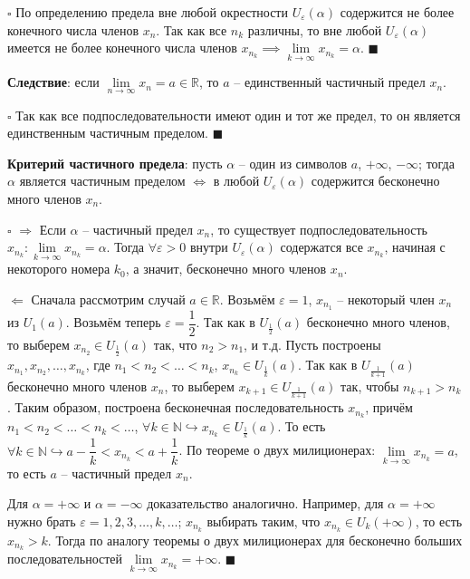 \documentclass[12pt, a4paper, reqno]{article}
\begin{document}
    $\square$ По определению предела вне любой окрестности $U_{\varepsilon}(\alpha)$ содержится не
    более конечного числа членов $x_n$. Так как все $n_k$ различны, то вне любой
    $U_{\varepsilon}(\alpha)$ имеется не более конечного числа членов $x_{n_k} \implies
    \lim\limits_{k\to\infty} x_{n_k} = \alpha$. $\blacksquare$

    \textbf{Следствие}: если  $\lim\limits_{n\to\infty} x_n = a\in\mathbb{R}$, то $a$ -- единственный
    частичный предел $x_n$.

    $\square$ Так как все подпоследовательности имеют один и тот же предел, то он является единственным
    частичным пределом. $\blacksquare$

    \textbf{Критерий частичного предела}: пусть $\alpha$ -- один из символов $a$, $+\infty$, $-\infty$;
    тогда $\alpha$ является частичным пределом $\iff$ в любой $U_{\varepsilon}(\alpha)$ содержится
    бесконечно много членов $x_n$.

    $\square$ $\boxed{\Rightarrow}$ Если $\alpha$ -- частичный предел $x_n$, то существует подпоследовательность
    $x_{n_k}: \lim\limits_{k\to\infty} x_{n_k} = \alpha$. Тогда $\forall \varepsilon > 0$ внутри
    $U_{\varepsilon}(\alpha)$ содержатся все $x_{n_k}$, начиная с некоторого номера $k_0$, а значит,
    бесконечно много членов $x_n$.

    $\boxed{\Leftarrow}$ Сначала рассмотрим случай $a\in\mathbb{R}$. Возьмём $\varepsilon = 1$, $x_{n_1}$
    -- некоторый член $x_n$ из $U_{1}(a)$. Возьмём теперь $\varepsilon = \dfrac{1}{2}$. Так как в
    $U_{\frac{1}{2}}(a)$ бесконечно много членов, то выберем $x_{n_2}\in U_{\frac{1}{2}}(a)$ так,
    что $n_2 > n_1$, и т.д. Пусть построены $x_{n_1}, x_{n_2}, \ldots, x_{n_k}$, где
    $n_1 < n_2 < \ldots < n_k$, $x_{n_k}\in U_{\frac{1}{k}}(a)$. Так как в $U_{\frac{1}{k+1}}(a)$
    бесконечно много членов $x_n$, то выберем $x_{k+1}\in U_{\frac{1}{k+1}}(a)$ так, чтобы
    $n_{k+1} > n_k$. Таким образом, построена бесконечная последовательность $x_{n_k}$, причём
    $n_1 < n_2 < \ldots < n_k < \ldots$, $\forall k\in\mathbb{N} \hookrightarrow x_{n_k}\in U_{\frac{1}{k}}(a)$.
    То есть $\forall k\in\mathbb{N} \hookrightarrow a - \dfrac{1}{k} < x_{n_k} < a + \dfrac{1}{k}$.
    По теореме о двух милиционерах: $\lim\limits_{k\to\infty} x_{n_k} = a$, то есть $a$ -- частичный
    предел $x_n$.

    Для $\alpha = +\infty$ и $\alpha = -\infty$ доказательство аналогично. Например, для
    $\alpha = +\infty$ нужно брать $\varepsilon = 1, 2, 3, \ldots, k, \ldots$; $x_{n_k}$ выбирать таким,
    что $x_{n_k}\in U_{k}(+\infty)$, то есть $x_{n_k} > k$. Тогда по аналогу теоремы о двух
    милиционерах для бесконечно больших последовательностей $\lim\limits_{k\to\infty} x_{n_k} =
    +\infty$. $\blacksquare$
\end{document}
